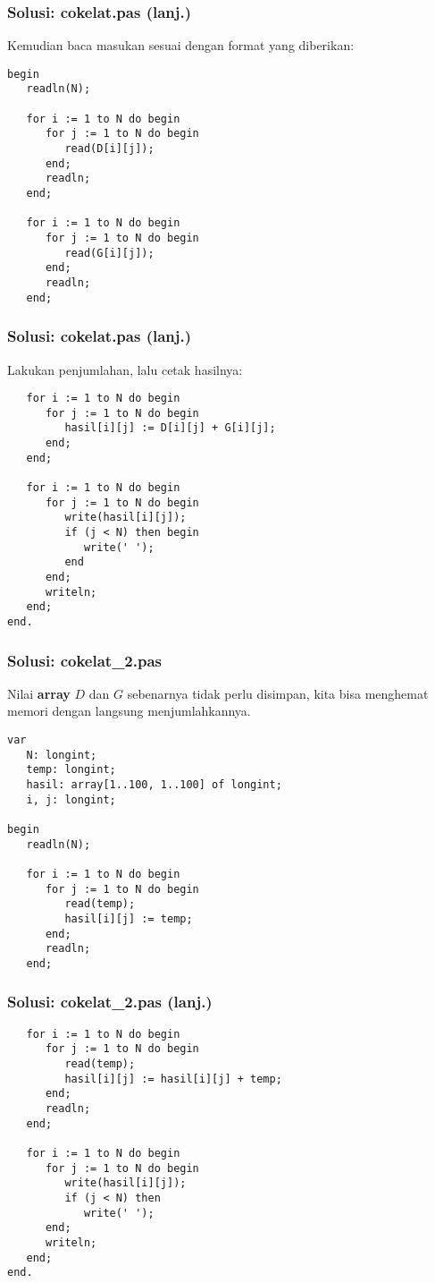 \documentclass{beamer}
\begin{document}
\begin{frame}[fragile]
\frametitle{Solusi: cokelat.pas (lanj.)}
Kemudian baca masukan sesuai dengan format yang diberikan:
\begin{lstlisting}
begin
   readln(N);
   
   for i := 1 to N do begin
      for j := 1 to N do begin
         read(D[i][j]);
      end;
      readln;
   end;

   for i := 1 to N do begin
      for j := 1 to N do begin
         read(G[i][j]);
      end;
      readln;
   end;
\end{lstlisting}
\end{frame}

\begin{frame}[fragile]
\frametitle{Solusi: cokelat.pas (lanj.)}
Lakukan penjumlahan, lalu cetak hasilnya:
\begin{lstlisting}
   for i := 1 to N do begin
      for j := 1 to N do begin
         hasil[i][j] := D[i][j] + G[i][j];
      end;
   end;   

   for i := 1 to N do begin
      for j := 1 to N do begin
         write(hasil[i][j]);
         if (j < N) then begin
            write(' ');
         end
      end;
      writeln;
   end;
end.
\end{lstlisting}
\end{frame}

\begin{frame}[fragile]
\frametitle{Solusi: cokelat\_2.pas}
Nilai \textbf{array} $D$ dan $G$ sebenarnya tidak perlu disimpan, kita bisa menghemat memori dengan langsung menjumlahkannya. 
\begin{lstlisting}
var
   N: longint;
   temp: longint;
   hasil: array[1..100, 1..100] of longint;
   i, j: longint;

begin
   readln(N);
   
   for i := 1 to N do begin
      for j := 1 to N do begin
         read(temp);
         hasil[i][j] := temp;
      end;
      readln;
   end;
\end{lstlisting}
\end{frame}

\begin{frame}[fragile]
\frametitle{Solusi: cokelat\_2.pas (lanj.)}
\begin{lstlisting}
   for i := 1 to N do begin
      for j := 1 to N do begin
         read(temp);
         hasil[i][j] := hasil[i][j] + temp;
      end;
      readln;
   end;

   for i := 1 to N do begin
      for j := 1 to N do begin
         write(hasil[i][j]);
         if (j < N) then 
            write(' ');
      end;
      writeln;
   end;
end.
\end{lstlisting}
\end{frame}
\end{document}
